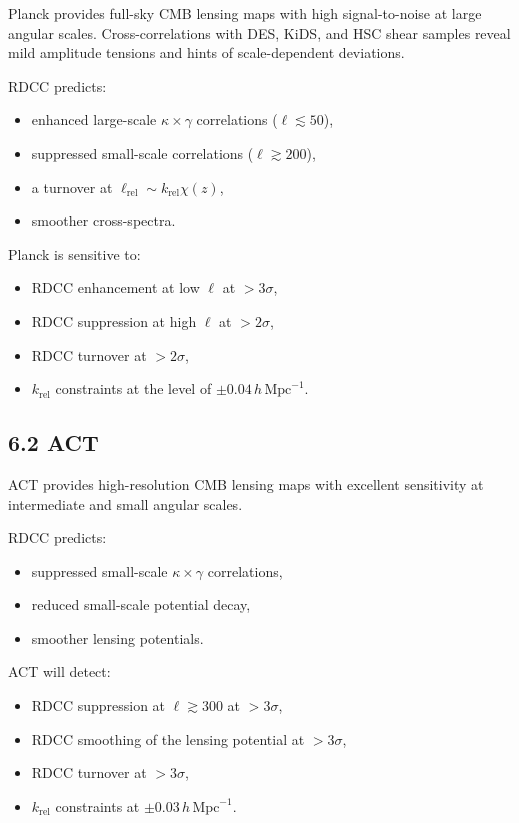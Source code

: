 \documentclass[11pt,a4paper]{article}
\begin{document}
Planck provides full-sky CMB lensing maps with high signal-to-noise at large angular scales. 
Cross-correlations with DES, KiDS, and HSC shear samples reveal mild amplitude tensions and 
hints of scale-dependent deviations.

RDCC predicts:

\begin{itemize}
    \item enhanced large-scale $\kappa \times \gamma$ correlations ($\ell \lesssim 50$),
    \item suppressed small-scale correlations ($\ell \gtrsim 200$),
    \item a turnover at $\ell_{\mathrm{rel}} \sim k_{\mathrm{rel}}\chi(z)$,
    \item smoother cross-spectra.
\end{itemize}

Planck is sensitive to:

\begin{itemize}
    \item RDCC enhancement at low $\ell$ at $>3\sigma$,
    \item RDCC suppression at high $\ell$ at $>2\sigma$,
    \item RDCC turnover at $>2\sigma$,
    \item $k_{\mathrm{rel}}$ constraints at the level of $\pm 0.04\,h\,\mathrm{Mpc}^{-1}$.
\end{itemize}

\subsection*{6.2 ACT}

ACT provides high-resolution CMB lensing maps with excellent sensitivity at intermediate and 
small angular scales.

RDCC predicts:

\begin{itemize}
    \item suppressed small-scale $\kappa \times \gamma$ correlations,
    \item reduced small-scale potential decay,
    \item smoother lensing potentials.
\end{itemize}

ACT will detect:

\begin{itemize}
    \item RDCC suppression at $\ell \gtrsim 300$ at $>3\sigma$,
    \item RDCC smoothing of the lensing potential at $>3\sigma$,
    \item RDCC turnover at $>3\sigma$,
    \item $k_{\mathrm{rel}}$ constraints at $\pm 0.03\,h\,\mathrm{Mpc}^{-1}$.
\end{itemize}
\end{document}
